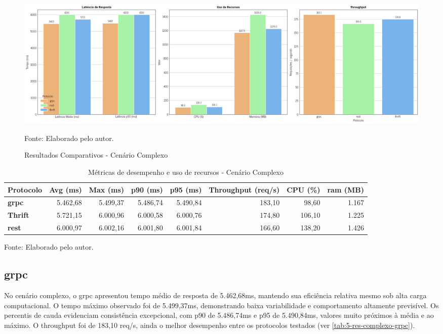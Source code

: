 \begin{figure}[H]
    \caption{Resultados Comparativos - Cenário Complexo}
    \label{fig:resultados_complexo}
    \centering
    \includegraphics[width=1\linewidth]{imagens/resultados/5-resultados-complexo.png}    
    {\par \raggedright \footnotesize Fonte: Elaborado pelo autor.\par}
\end{figure}


\begin{table}[H]
\centering
\caption{Métricas de desempenho e uso de recursos - Cenário Complexo}
\label{tab:res_complexo}
\begin{tabular}[\linewidth]{lrrrrrrr}
\hline
Protocolo & Avg (ms) & Max (ms) & p90 (ms) & p95 (ms) & Throughput (req/s) & CPU (\%) & \acrshort{ram} (MB) \\
\hline
\textbf{\acrshort{grpc}}   & 5.462,68 & 5.499,37 & 5.486,74 & 5.490,84 & 183,10 & 98,60 & 1.167 \\
\textbf{Thrift} & 5.721,15 & 6.000,96 & 6.000,58 & 6.000,76 & 174,80 & 106,10 & 1.225 \\
\textbf{\gls{rest}}   & 6.000,97 & 6.002,16 & 6.001,80 & 6.001,84 & 166,60 & 138,20 & 1.426 \\
\hline
\end{tabular}
{\par \raggedright \footnotesize Fonte: Elaborado pelo autor.\par}
\end{table}

\subsection{\acrshort{grpc}}

No cenário complexo, o \gls{grpc} apresentou tempo médio de resposta de 5.462,68ms, mantendo sua eficiência relativa mesmo sob alta carga computacional. O tempo máximo observado foi de 5.499,37ms, demonstrando baixa variabilidade e comportamento altamente previsível. Os percentis de cauda evidenciam consistência excepcional, com p90 de 5.486,74ms e p95 de 5.490,84ms, valores muito próximos à média e ao máximo. O throughput foi de 183,10 req/s, ainda o melhor desempenho entre os protocolos testados (ver \autoref{tab:5-res-complexo-grpc}).

